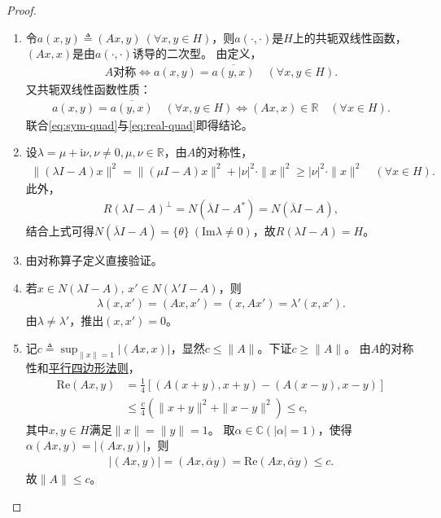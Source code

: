 \documentclass[../../main.tex]{subfiles}%
\begin{document}
\begin{proof}
\begin{enumerate}[(1)]
\item 令$a(x,y)\triangleq(Ax,y)\ (\forall x,y\in H)$，则$a(\cdot,\cdot)$是$H$上的共轭双线性函数，$(Ax,x)$是由$a(\cdot,\cdot)$诱导的二次型。
由定义，
\begin{align}
A\text{对称}\iff a(x,y)=\overline{a(y,x)}\quad(\forall x,y\in H).\label{eq:sym-quad}
\end{align}
又共轭双线性函数性质：
\begin{align}
a(x,y)=\overline{a(y,x)}\quad(\forall x,y\in H)\iff(Ax,x)\in\mathbb{R}\quad(\forall x\in H).\label{eq:real-quad}
\end{align}
联合\eqref{eq:sym-quad}与\eqref{eq:real-quad}即得结论。

\item 设$\lambda=\mu+\mathrm{i}\nu,\nu\neq0,\mu,\nu\in\mathbb{R}$，由$A$的对称性，
\begin{align*}
\|(\lambda I-A)x\|^2=\|(\mu I-A)x\|^2+|\nu|^2\cdot\|x\|^2
\geqslant|\nu|^2\cdot\|x\|^2\quad(\forall x\in H).
\end{align*}
此外，
\begin{align*}
R(\lambda I-A)^\perp=N(\overline{\lambda}I-A^*)=N(\overline{\lambda}I-A),
\end{align*}
结合上式可得$N(\overline{\lambda}I-A)=\{\theta\}\ (\mathrm{Im}\lambda\neq0)$，故$R(\lambda I-A)=H$。

\item 由对称算子定义直接验证。

\item 若$x\in N(\lambda I-A),\,x'\in N(\lambda'I-A)$，则
\begin{align*}
\lambda(x,x')=(Ax,x')=(x,Ax')=\lambda'(x,x').
\end{align*}
由$\lambda\neq\lambda'$，推出$(x,x')=0$。

\item 记$\displaystyle c\triangleq\sup_{\|x\|=1}|(Ax,x)|$，显然$c\leqslant\|A\|$。下证$c\geqslant\|A\|$。
由$A$的对称性和\hyperref[proposition:平行四边形等式--泛函分析]{平行四边形法则}，
\begin{align*}
\mathrm{Re}(Ax,y)&=\frac{1}{4}\left[(A(x+y),x+y)-(A(x-y),x-y)\right]\\
&\leqslant\frac{c}{4}\left(\|x+y\|^2+\|x-y\|^2\right)\leqslant c,
\end{align*}
其中$x,y\in H$满足$\|x\|=\|y\|=1$。
取$\alpha\in\mathbb{C}(|\alpha|=1)$，使得$\alpha(Ax,y)=|(Ax,y)|$，则
\begin{align*}
|(Ax,y)|=(Ax,\overline{\alpha}y)=\mathrm{Re}(Ax,\overline{\alpha}y)\leqslant c.
\end{align*}
故$\|A\|\leqslant c$。
\end{enumerate}

\end{proof}
\end{document}
